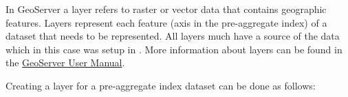 In GeoServer a layer refers to raster or vector data that contains geographic features. Layers represent each feature (axis in the pre-aggregate index) of a dataset that needs to be represented. All layers much have a source of the data which in this case was setup in . More information about layers can be found in the \href{http://docs.geoserver.org/stable/en/user/webadmin/data/layers.html}{GeoServer User Manual}. 

Creating a layer for a pre-aggregate index dataset can be done as follows:

